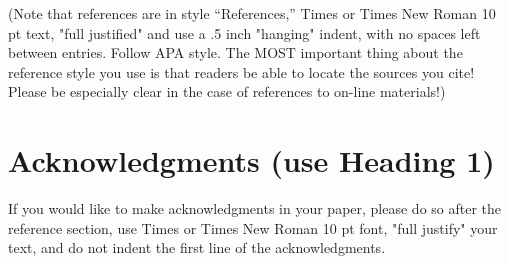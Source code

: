 \documentclass{ICLSarticle}
\author{Author Name, Institution, Email \and Author Name 2, Institution, Email%

(if same institution, put all authors separated by commas, Institution,

then put on new line "Email: email 1, email 2, email 3" in order of authorship)
\vspace{-10ex}} %
\begin{document}
\maketitle
\begin{ICLSabstract}
\end{ICLSabstract}






\printbibliography[title={References (use Heading 1)}]


(Note that references are in style “References,” Times or Times New Roman 10 pt text, "full justified" and use a .5 inch "hanging" indent, with no spaces left between entries. Follow APA style. The MOST important thing about the reference style you use is that readers be able to locate the sources you cite! Please be especially clear in the case of references to on-line materials!)

\section{Acknowledgments (use Heading 1)}

If you would like to make acknowledgments in your paper, please do so after the reference section, use Times or Times New Roman 10 pt font, "full justify" your text, and do not indent the first line of the acknowledgments.
\end{document}
